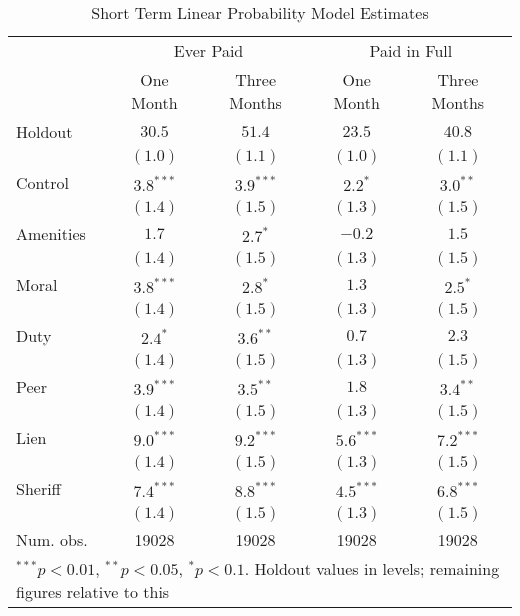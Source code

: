 \documentclass[12pt]{article}
\begin{document}
\begin{table}[ht]
\centering
\caption{Short Term Linear Probability Model Estimates} \label{pc_lin}
\bigskip
\begin{tabular}{l c c c c }
\hline
 & \multicolumn{2}{c}{Ever Paid} & \multicolumn{2}{c}{Paid in Full} \\
          & One Month & Three Months & One Month & Three Months \\
Holdout   & $30.5$ & $51.4$ & $23.5$ & $40.8$ \\
\hline
          & $(1.0)$      & $(1.1)$      & $(1.0)$      & $(1.1)$      \\
Control   & $3.8^{***}$  & $3.9^{***}$  & $2.2^{*}$    & $3.0^{**}$   \\
          & $(1.4)$      & $(1.5)$      & $(1.3)$      & $(1.5)$      \\
Amenities & $1.7$        & $2.7^{*}$    & $-0.2$       & $1.5$        \\
          & $(1.4)$      & $(1.5)$      & $(1.3)$      & $(1.5)$      \\
Moral     & $3.8^{***}$  & $2.8^{*}$    & $1.3$        & $2.5^{*}$    \\
          & $(1.4)$      & $(1.5)$      & $(1.3)$      & $(1.5)$      \\
Duty      & $2.4^{*}$    & $3.6^{**}$   & $0.7$        & $2.3$        \\
          & $(1.4)$      & $(1.5)$      & $(1.3)$      & $(1.5)$      \\
Peer      & $3.9^{***}$  & $3.5^{**}$   & $1.8$        & $3.4^{**}$   \\
          & $(1.4)$      & $(1.5)$      & $(1.3)$      & $(1.5)$      \\
Lien      & $9.0^{***}$  & $9.2^{***}$  & $5.6^{***}$  & $7.2^{***}$  \\
          & $(1.4)$      & $(1.5)$      & $(1.3)$      & $(1.5)$      \\
Sheriff   & $7.4^{***}$  & $8.8^{***}$  & $4.5^{***}$  & $6.8^{***}$  \\
          & $(1.4)$      & $(1.5)$      & $(1.3)$      & $(1.5)$      \\
\hline
Num. obs. & 19028        & 19028        & 19028        & 19028        \\
\hline
\multicolumn{5}{l}{\scriptsize{$^{***}p<0.01$, $^{**}p<0.05$, $^*p<0.1$. Holdout values in levels; remaining figures relative to this}}
\end{tabular}
\end{table}
\end{document}

